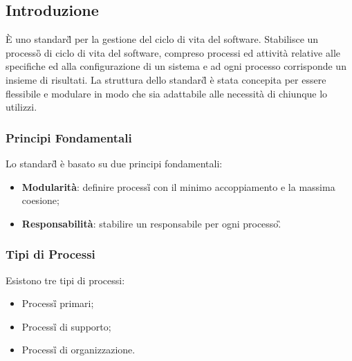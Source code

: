 \subsection{Introduzione}
È uno standard\G{} per la gestione del ciclo di vita del software. Stabilisce un processo\G{} di ciclo di vita del software, compreso processi ed attività relative alle specifiche ed alla configurazione di un sistema e ad ogni processo corrisponde un insieme di risultati.
La struttura dello standard\G{} è stata concepita per essere flessibile e modulare in modo che sia adattabile alle necessità di chiunque lo utilizzi.

\subsubsection{Principi Fondamentali}
Lo standard\G{} è basato su due principi fondamentali:
\begin{itemize}
	\item \textbf{Modularità}: definire processi\G{} con il minimo accoppiamento e la massima coesione;
	\item \textbf{Responsabilità}: stabilire un responsabile per ogni processo\G.
\end{itemize}

\subsubsection{Tipi di Processi}
Esistono tre tipi di processi:
\begin{itemize}
	\item Processi\G{} primari;
	\item Processi\G{} di supporto;
	\item Processi\G{} di organizzazione.
\end{itemize}
